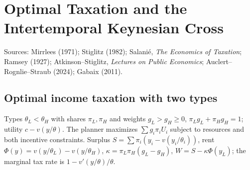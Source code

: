 \chapter{Optimal Taxation and the Intertemporal Keynesian Cross}
\label{chap:optimal_tax_ikc}

Sources: Mirrlees (1971); Stiglitz (1982); Salanié, \emph{The Economics of Taxation}; Ramsey (1927); Atkinson--Stiglitz,
\emph{Lectures on Public Economics}; Auclert--Rognlie--Straub (2024); Gabaix (2011).

\section{Optimal income taxation with two types}

\begin{definition}
\label{def:mirrlees2}
\leanok
Types $\theta_L<\theta_H$ with shares $\pi_L,\pi_H$ and weights $g_L>g_H\ge0$, $\pi_Lg_L+\pi_Hg_H=1$; utility $c-v(y/\theta)$.
The planner maximizes $\sum g_i\pi_iU_i$ subject to resources and both incentive constraints. Surplus
$S=\sum\pi_i(y_i-v(y_i/\theta_i))$, rent $\Phi(y)=v(y/\theta_L)-v(y/\theta_H)$, $\kappa=\pi_L\pi_H(g_L-g_H)$,
$W=S-\kappa\Phi(y_L)$; the marginal tax rate is $1-v'(y/\theta)/\theta$.
\end{definition}

